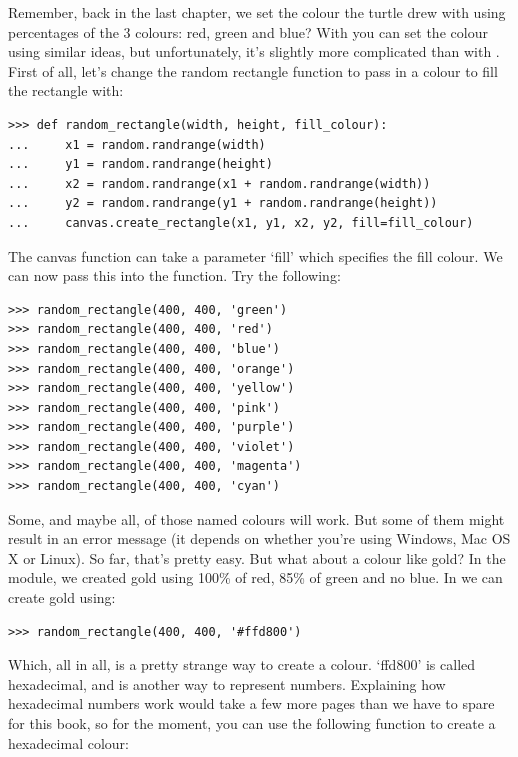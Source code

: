 Remember, back in the last chapter, we set the colour the turtle drew with using percentages of the 3 colours: red, green and blue? With  you can set the colour using similar ideas, but unfortunately, it's slightly more complicated than with .  First of all, let's change the random rectangle function to pass in a colour to fill the rectangle with:

\begin{listing}
\begin{verbatim}
>>> def random_rectangle(width, height, fill_colour):
...     x1 = random.randrange(width)
...     y1 = random.randrange(height)
...     x2 = random.randrange(x1 + random.randrange(width))
...     y2 = random.randrange(y1 + random.randrange(height))
...     canvas.create_rectangle(x1, y1, x2, y2, fill=fill_colour)
\end{verbatim}
\end{listing}

The canvas  function can take a parameter `fill' which specifies the fill colour.  We can now pass this into the function. Try the following:

\begin{listing}
\begin{verbatim}
>>> random_rectangle(400, 400, 'green')
>>> random_rectangle(400, 400, 'red')
>>> random_rectangle(400, 400, 'blue')
>>> random_rectangle(400, 400, 'orange')
>>> random_rectangle(400, 400, 'yellow')
>>> random_rectangle(400, 400, 'pink')
>>> random_rectangle(400, 400, 'purple')
>>> random_rectangle(400, 400, 'violet')
>>> random_rectangle(400, 400, 'magenta')
>>> random_rectangle(400, 400, 'cyan')
\end{verbatim}
\end{listing}

Some, and maybe all, of those named colours will work.  But some of them might result in an error message (it depends on whether you're using Windows, Mac OS X or Linux). So far, that's pretty easy.  But what about a colour like gold?  In the  module, we created gold using 100\% of red, 85\% of green and no blue.  In  we can create gold using:

\begin{listing}
\begin{verbatim}
>>> random_rectangle(400, 400, '#ffd800')
\end{verbatim}
\end{listing}

Which, all in all, is a pretty strange way to create a colour.  `ffd800' is called hexadecimal, and is another way to represent numbers.  Explaining how hexadecimal numbers work would take a few more pages than we have to spare for this book, so for the moment, you can use the following function to create a hexadecimal colour:

